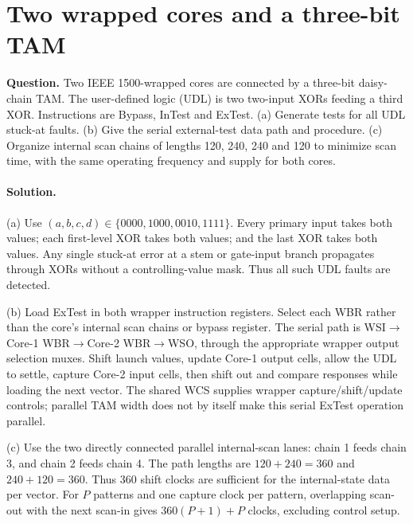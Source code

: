 \documentclass[11pt]{article}
\newcommand{\sol}{\paragraph{Solution.}}
\begin{document}
\section{Two wrapped cores and a three-bit TAM}
\textbf{Question.} Two IEEE 1500-wrapped cores are connected by a
three-bit daisy-chain TAM. The user-defined logic (UDL) is two two-input XORs
feeding a third XOR. Instructions are Bypass, InTest and ExTest.
(a) Generate tests for all UDL stuck-at faults.
(b) Give the serial external-test data path and procedure.
(c) Organize internal scan chains of lengths 120, 240, 240 and 120 to minimize
scan time, with the same operating frequency and supply for both cores.
\begin{center}\end{center}

\sol (a) Use $(a,b,c,d)\in\{0000,1000,0010,1111\}$.
Every primary input takes both values; each first-level XOR takes both values;
and the last XOR takes both values. Any single stuck-at error at a stem or
gate-input branch propagates through XORs without a controlling-value mask.
Thus all such UDL faults are detected.

(b) Load ExTest in both wrapper instruction registers.
Select each WBR rather than the core's internal scan chains or bypass register.
The serial path is
WSI$\to$Core-1 WBR$\to$Core-2 WBR$\to$WSO, through the appropriate
wrapper output selection muxes. Shift launch values, update Core-1 output
cells, allow the UDL to settle, capture Core-2 input cells, then shift out and
compare responses while loading the next vector. The shared WCS supplies
wrapper capture/shift/update controls; parallel TAM width does not by itself
make this serial ExTest operation parallel.

(c) Use the two directly connected parallel internal-scan lanes:
chain 1 feeds chain 3, and chain 2 feeds chain 4.
The path lengths are $120+240=360$ and $240+120=360$.
Thus 360 shift clocks are sufficient for the internal-state data per vector.
For $P$ patterns and one capture clock per pattern, overlapping scan-out with
the next scan-in gives $360(P+1)+P$ clocks, excluding control setup.
\end{document}
